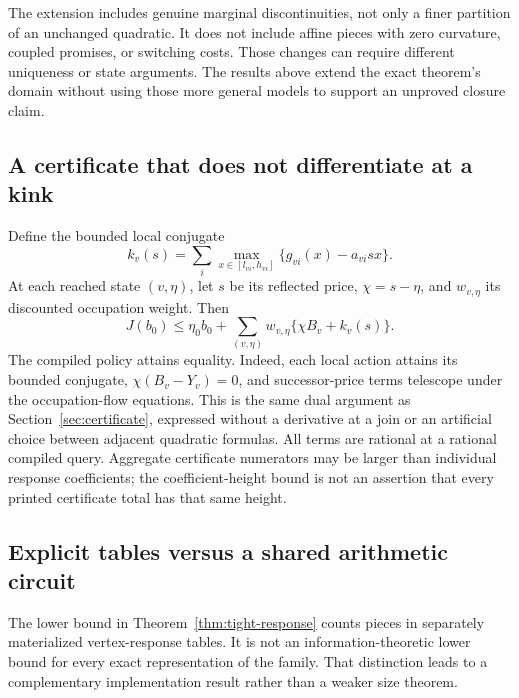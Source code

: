 The extension includes genuine marginal discontinuities, not only a finer partition of an unchanged quadratic. It does not include affine pieces with zero curvature, coupled promises, or switching costs. Those changes can require different uniqueness or state arguments. The results above extend the exact theorem's domain without using those more general models to support an unproved closure claim.

\subsection{A certificate that does not differentiate at a kink}
Define the bounded local conjugate
\[
 k_v(s)=\sum_i\max_{x\in[l_{vi},h_{vi}]}\{g_{vi}(x)-a_{vi}sx\}.
\]
At each reached state $(v,\eta)$, let $s$ be its reflected price, $\chi=s-\eta$, and $w_{v,\eta}$ its discounted occupation weight. Then
\begin{equation}\label{eq:r33-conjugate-certificate}
 J(b_0)\leq \eta_0b_0+
 \sum_{(v,\eta)}w_{v,\eta}\{\chi B_v+k_v(s)\}.
\end{equation}
The compiled policy attains equality. Indeed, each local action attains its bounded conjugate, $\chi(B_v-Y_v)=0$, and successor-price terms telescope under the occupation-flow equations. This is the same dual argument as Section~\ref{sec:certificate}, expressed without a derivative at a join or an artificial choice between adjacent quadratic formulas. All terms are rational at a rational compiled query. Aggregate certificate numerators may be larger than individual response coefficients; the coefficient-height bound is not an assertion that every printed certificate total has that same height.

\subsection{Explicit tables versus a shared arithmetic circuit}
The lower bound in Theorem~\ref{thm:tight-response} counts pieces in separately materialized vertex-response tables. It is not an information-theoretic lower bound for every exact representation of the family. That distinction leads to a complementary implementation result rather than a weaker size theorem.

